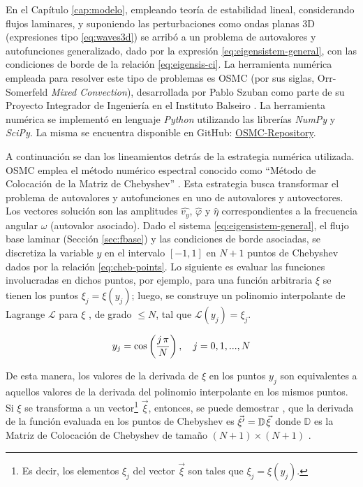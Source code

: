 En el Capítulo \ref{cap:modelo}, empleando teoría de estabilidad lineal, considerando flujos laminares, y suponiendo las perturbaciones como ondas planas 3D (expresiones tipo \ref{eq:waves3d}) se arribó a un problema de autovalores y autofunciones generalizado, dado por la expresión \ref{eq:eigensistem-general}, con las condiciones de borde de la relación \ref{eq:eigensis-ci}. La herramienta numérica empleada para resolver este tipo de problemas es OSMC (por sus siglas, Orr-Somerfeld \textit{Mixed Convection}), desarrollada por Pablo Szuban como parte de su Proyecto Integrador de Ingeniería en el Instituto Balseiro \cite{szuban2023}. La herramienta numérica se implementó en lenguaje \textit{Python} utilizando las librerías \textit{NumPy} y \textit{SciPy}. La misma se encuentra disponible en GitHub: \href{https://github.com/Pato4184/OSMC-Repository}{OSMC-Repository}.

A continuación se dan los lineamientos detrás de la estrategia numérica utilizada. OSMC emplea el método numérico espectral conocido como ``Método de Colocación de la Matriz de Chebyshev'' \cite{moin2010fundamentals}. Esta estrategia busca transformar el problema de autovalores y autofunciones en uno de autovalores y autovectores. Los vectores solución son las amplitudes $\widehat{v_y}$, $\widehat{\varphi}$ y $\widehat{\eta}$ correspondientes a la frecuencia angular $\omega$ (autovalor asociado). Dado el sistema \ref{eq:eigensistem-general}, el flujo base laminar (Sección \ref{sec:fbase}) y las condiciones de borde asociadas, se discretiza la variable $y$ en el intervalo $\left[-1,1\right]$ en $N+1$ puntos de Chebyshev dados por la relación \ref{eq:cheb-points}. Lo siguiente es evaluar las funciones involucradas en dichos puntos, por ejemplo, para una función arbitraria $\xi$ se tienen los puntos $\xi_j = \xi(y_j)$; luego, se construye un polinomio interpolante de Lagrange $\mathcal{L}$ para $\xi$ , de grado $\leq N$, tal que $\mathcal{L}(y_j) = \xi_j$.

\begin{equation}
y_j = \cos \left( \frac{j \hspace{0.5mm} \pi}{N} \right), \quad j=0,1,...,N 
\label{eq:cheb-points}
\end{equation}

De esta manera, los valores de la derivada de $\xi$ en los puntos $y_j$ son equivalentes a aquellos valores de la derivada del polinomio interpolante en los mismos puntos. Si $\xi$ se transforma a un vector\footnote{Es decir, los elementos $\xi_j$ del vector $\vec{\xi}$ son tales que $\xi_j = \xi(y_j)$.} $\vec{\xi}$, entonces, se puede demostrar \cite{moin2010fundamentals}, que la derivada de la función evaluada en los puntos de Chebyshev es $\vec{\xi^{\prime}} = \mathbb{D} \hspace{0.4mm} \vec{\xi}$ donde $\mathbb{D}$ es la Matriz de Colocación de Chebyshev de tamaño $(N+1) \times (N+1)$ \cite{trefethen}.

